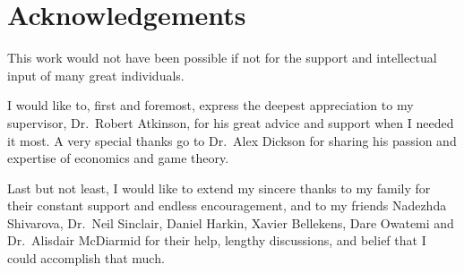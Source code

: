 \chapter*{Acknowledgements} %
\label{cha:acknowledgements}
\mtcaddchapter[Acknowledgements]

This work would not have been possible if not for the support and intellectual input of many great individuals.

I would like to, first and foremost, express the deepest appreciation to my supervisor, Dr.~Robert Atkinson, for his great advice and support when I needed it most. A very special thanks go to Dr.~Alex Dickson for sharing his passion and expertise of economics and game theory.

Last but not least, I would like to extend my sincere thanks to my family for their constant support and endless encouragement, and to my friends Nadezhda Shivarova, Dr.~Neil Sinclair, Daniel Harkin, Xavier Bellekens, Dare Owatemi and Dr.~Alisdair McDiarmid for their help, lengthy discussions, and belief that I could accomplish that much.

